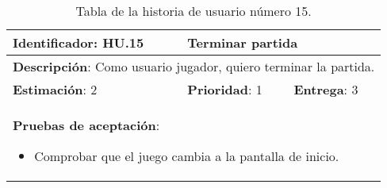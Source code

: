 \begin{table}[h]
  \begin{center}
    \begin{tabular}{|p{4cm}|p{4cm}|p{4cm}|}

    \hline
    \textbf{Identificador}: HU.15
    & \multicolumn{2}{p{8cm}|}{Terminar partida}\\

    \hline
    \multicolumn{3}{|p{12cm}|}{\textbf{Descripción}: Como usuario jugador, quiero terminar la partida.}\\

    \hline
    \textbf{Estimación}: 2
    & \textbf{Prioridad}: 1
    & \textbf{Entrega}: 3\\

    \hline
    \multicolumn{3}{|p{12cm}|}{\textbf{Pruebas de aceptación}:
      \begin{itemize}
        \item Comprobar que el juego cambia a la pantalla de inicio.
      \end{itemize}
    }\\

    \hline

    \end{tabular}

    \caption{Tabla de la historia de usuario número 15.}
    \label{tabla-hu15}

  \end{center}
\end{table}


